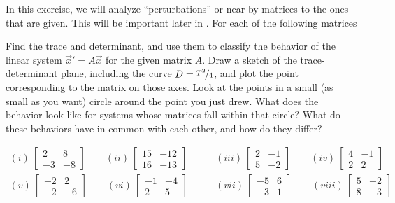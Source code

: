 \begin{exercise}
In this exercise, we will analyze ``perturbations'' or near-by matrices to the ones that are given. This will be important later in . For each of the following matrices
\begin{tasks}
\task Find the trace and determinant, and use them to classify the behavior of the linear system ${\vec{x}}' = A\vec{x}$ for the given matrix $A$.
\task Draw a sketch of the trace-determinant plane, including the curve $D = \nicefrac{T^2}{4}$, and plot the point corresponding to the matrix on those axes.
\task Look at the points in a small (as small as you want) circle around the point you just drew. What does the behavior look like for systems whose matrices fall within that circle? What do these behaviors have in common with each other, and how do they differ?
\end{tasks}
\begin{equation*}
\begin{split}
(i)\ \begin{bmatrix} 2 & 8 \\ -3 & -8 \end{bmatrix} \qquad (ii)\ \begin{bmatrix} 15 & -12 \\ 16 & -13 \end{bmatrix} \qquad &(iii)\ \begin{bmatrix} 2 & -1 \\ 5 & -2 \end{bmatrix} \qquad (iv)\ \begin{bmatrix} 4 & -1 \\ 2 & 2 \end{bmatrix}\\
(v)\ \begin{bmatrix} -2 & 2 \\ -2 & -6 \end{bmatrix} \qquad (vi)\ \begin{bmatrix} -1 & -4 \\ 2 & 5 \end{bmatrix} \qquad &(vii)\ \begin{bmatrix} -5 & 6 \\ -3 & 1 \end{bmatrix} \qquad (viii)\ \begin{bmatrix} 5 & -2 \\ 8 & -3 \end{bmatrix} 
\end{split}
\end{equation*}
\end{exercise}
